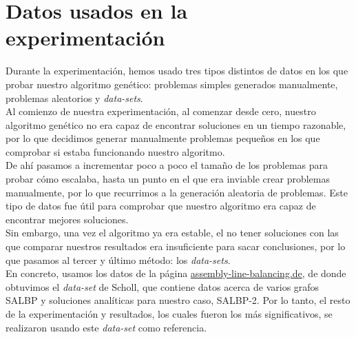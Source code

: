 \documentclass[12pt,a4paper]{report}
\begin{document}
    \section{Datos usados en la experimentación}
    \label{section:Datos}
    Durante la experimentación, hemos usado tres tipos distintos de datos en los que probar nuestro algoritmo genético: problemas simples generados manualmente, problemas aleatorios y \textit{data-sets}.\\
    Al comienzo de nuestra experimentación, al comenzar desde cero, nuestro algoritmo genético no era capaz de encontrar soluciones en un tiempo razonable, por lo que decidimos generar manualmente problemas pequeños en los que comprobar si estaba funcionando nuestro algoritmo.\\
    De ahí pasamos a incrementar poco a poco el tamaño de los problemas para probar cómo escalaba, hasta un punto en el que era inviable crear problemas manualmente, por lo que recurrimos a la generación aleatoria de problemas. Este tipo de datos fue útil para comprobar que nuestro algoritmo era capaz de encontrar mejores soluciones.\\
    Sin embargo, una vez el algoritmo ya era estable, el no tener soluciones con las que comparar nuestros resultados era insuficiente para sacar conclusiones, por lo que pasamos al tercer y último método: los \textit{data-sets}.\\
    En concreto, usamos los datos de la página \textcolor{blue}{\href{https://assembly-line-balancing.de/salbp/benchmark-data-sets-1993/}{assembly-line-balancing.de}}, de donde obtuvimos el \textit{data-set} de Scholl, que contiene datos acerca de varios grafos SALBP y soluciones analíticas para nuestro caso, SALBP-2. Por lo tanto, el resto de la experimentación y resultados, los cuales fueron los más significativos, se realizaron usando este \textit{data-set} como referencia.
    \newpage
\end{document}
